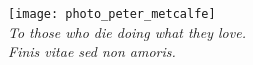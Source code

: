 %
%

\pubmode
	\onecolumngrid
\fi

\vspace*{180pt}
\begin{center}
	\texttt{[image: photo\_peter\_metcalfe]}\\
	\textit{To those who die doing what they love.\\ Finis vitae sed non amoris.}
\end{center}
\newpage

\pubmode
	\twocolumngrid
\fi
